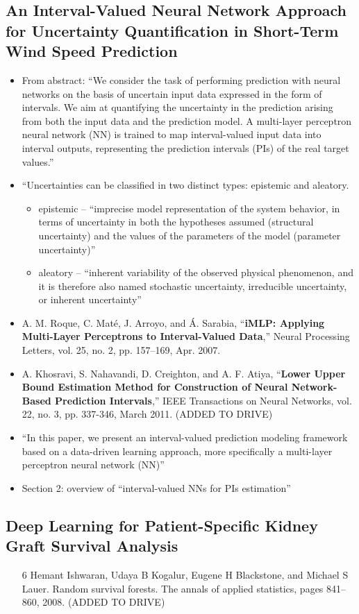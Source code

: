 \documentclass{article}
\begin{document}
\subsection{An Interval-Valued Neural Network Approach for Uncertainty Quantification in Short-Term Wind Speed Prediction}
\begin{itemize}
\item From abstract: ``We consider the task of performing prediction with neural networks on the basis of uncertain input data expressed in the form of intervals. We aim at quantifying the uncertainty in the prediction arising from both the input data and the prediction model. A multi-layer perceptron neural network (NN) is trained to map interval-valued input data into interval outputs, representing the prediction intervals (PIs) of the real target values.''
\item ``Uncertainties can be classified in two distinct types: epistemic and aleatory. 
      \begin{itemize}
      \item epistemic -- ``imprecise model representation of the system behavior, in terms of uncertainty in both the hypotheses assumed (structural uncertainty) and the values of the parameters of the model (parameter uncertainty)''
      \item aleatory -- ``inherent variability of the observed physical phenomenon, and it is therefore also named stochastic uncertainty, irreducible uncertainty, or inherent uncertainty''
      \end{itemize}
\item A. M. Roque, C. Maté, J. Arroyo, and Á. Sarabia, “{\bf iMLP: Applying Multi-Layer Perceptrons to Interval-Valued Data},” Neural Processing Letters, vol. 25, no. 2, pp. 157–169, Apr. 2007.
\item A. Khosravi, S. Nahavandi, D. Creighton, and A. F. Atiya, “{\bf Lower Upper Bound Estimation Method for Construction of Neural Network- Based Prediction Intervals},” IEEE Transactions on Neural Networks, vol. 22, no. 3, pp. 337-346, March 2011. (ADDED TO DRIVE)
\item ``In this paper, we present an interval-valued prediction modeling framework based on a data-driven learning approach, more specifically a multi-layer perceptron neural network (NN)''
\item Section 2: overview of ``interval-valued NNs for PIs estimation''
\end{itemize}

\subsection{Deep Learning for Patient-Specific Kidney Graft Survival Analysis}
\begin{itemize}
\item [6] Hemant Ishwaran, Udaya B Kogalur, Eugene H Blackstone, and Michael S Lauer. Random survival forests. The annals of applied statistics, pages 841–860, 2008. (ADDED TO DRIVE)
\end{itemize}
\end{document}
